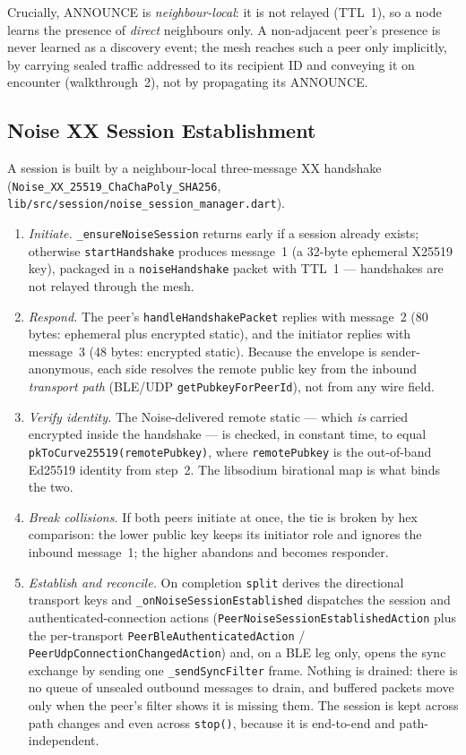 \documentclass[11pt]{report}
\newcommand{\code}[1]{\texttt{\small #1}}
\begin{document}
Crucially, ANNOUNCE is \emph{neighbour-local}: it is not relayed (TTL~1), so a
node learns the presence of \emph{direct} neighbours only. A non-adjacent peer's
presence is never learned as a discovery event; the mesh reaches such a peer
only implicitly, by carrying sealed traffic addressed to its recipient ID and
conveying it on encounter (walkthrough~2), not by propagating its ANNOUNCE.

\subsection{Noise XX Session Establishment}

A session is built by a neighbour-local three-message XX handshake
(\code{Noise\_XX\_25519\_ChaChaPoly\_SHA256},
\code{lib/src/session/noise\_session\_manager.dart}).

\begin{enumerate}
  \item \emph{Initiate.} \code{\_ensureNoiseSession} returns early if a session
    already exists; otherwise \code{startHandshake} produces message~1 (a
    32-byte ephemeral X25519 key), packaged in a \code{noiseHandshake} packet
    with TTL~1 --- handshakes are not relayed through the mesh.
  \item \emph{Respond.} The peer's \code{handleHandshakePacket} replies with
    message~2 (80 bytes: ephemeral plus encrypted static), and the initiator
    replies with message~3 (48 bytes: encrypted static). Because the envelope is
    sender-anonymous, each side resolves the remote public key from the inbound
    \emph{transport path} (BLE/UDP \code{getPubkeyForPeerId}), not from any wire
    field.
  \item \emph{Verify identity.} The Noise-delivered remote static --- which
    \emph{is} carried encrypted inside the handshake --- is checked, in constant
    time, to equal \code{pkToCurve25519(remotePubkey)}, where \code{remotePubkey}
    is the out-of-band Ed25519 identity from step~2. The libsodium birational
    map is what binds the two.
  \item \emph{Break collisions.} If both peers initiate at once, the tie is
    broken by hex comparison: the lower public key keeps its initiator role and
    ignores the inbound message~1; the higher abandons and becomes responder.
  \item \emph{Establish and reconcile.} On completion \code{split} derives the
    directional transport keys and \code{\_onNoiseSessionEstablished} dispatches
    the session and authenticated-connection actions
    (\code{PeerNoiseSessionEstablishedAction} plus the per-transport
    \code{PeerBleAuthenticatedAction} / \code{PeerUdpConnectionChangedAction})
    and, on a BLE leg only, opens the sync exchange by sending one
    \code{\_sendSyncFilter} frame. Nothing is drained: there is no queue of
    unsealed outbound messages to drain, and buffered packets move only when
    the peer's filter shows it is missing them. The session is kept across path
    changes and even across \code{stop()}, because it is end-to-end and
    path-independent.
\end{enumerate}
\end{document}
